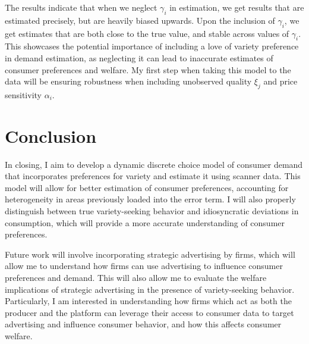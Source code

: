 \documentclass[12pt]{article}
\begin{document}
  The results indicate that when we neglect $\gamma_i$ in estimation, we get results that are estimated precisely, but are heavily biased upwards. Upon the inclusion of $\gamma_i$, we get estimates that are both close to the true value, and stable across values of $\gamma_i$. This showcases the potential importance of including a love of variety preference in demand estimation, as neglecting it can lead to inaccurate estimates of consumer preferences and welfare. My first step when taking this model to the data will be ensuring robustness when including unobserved quality $\xi_j$ and price sensitivity $\alpha_i$.


\section{Conclusion}

In closing, I aim to develop a dynamic discrete choice model of consumer demand that incorporates preferences for variety and estimate it using scanner data. This model will allow for better estimation of consumer preferences, accounting for heterogeneity in areas previously loaded into the error term. I will also properly distinguish between true variety-seeking behavior and idiosyncratic deviations in consumption, which will provide a more accurate understanding of consumer preferences. 

Future work will involve incorporating strategic advertising by firms, which will allow me to understand how firms can use advertising to influence consumer preferences and demand. This will also allow me to evaluate the welfare implications of strategic advertising in the presence of variety-seeking behavior. Particularly, I am interested in understanding how firms which act as both the producer and the platform can leverage their access to consumer data to target advertising and influence consumer behavior, and how this affects consumer welfare. 
\newpage


\end{document}
